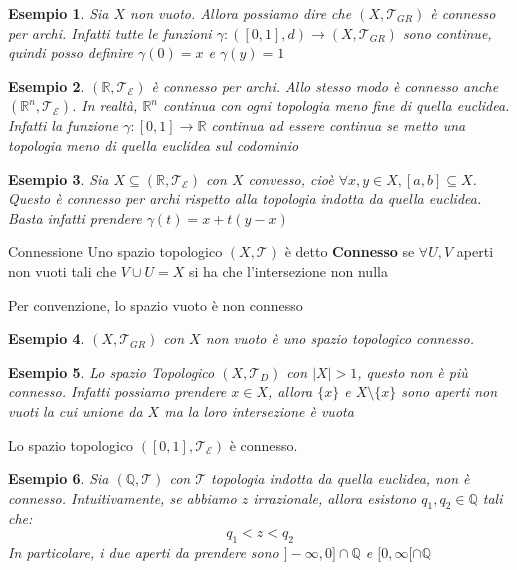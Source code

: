 \documentclass[11pt,a4paper,twoside]{article}
\newtheorem{es}{Esempio}
\theoremstyle{definition}
\begin{document}
\begin{es}
	Sia $X$ non vuoto. Allora possiamo dire che $(X, \mathcal T_{GR})$ è connesso per archi. Infatti tutte le funzioni $\gamma:([0,1],d) \to (X, \mathcal T_{GR})$ sono continue, quindi posso definire $\gamma(0)=x$ e $\gamma(y)=1$
\end{es}

\begin{es}
	$(\mathbb R, \mathcal T_\mathcal E)$ è connesso per archi. Allo stesso modo è connesso anche $(\mathbb R^n, \mathcal T_\mathcal E)$. In realtà, $\mathbb R^n$ continua con ogni topologia meno fine di quella euclidea. Infatti la funzione $\gamma:[0,1]\to \mathbb R$ continua ad essere continua se metto una topologia meno di quella euclidea sul codominio
\end{es}

\begin{es}
	Sia $X \subseteq (\mathbb R, \mathcal T_\mathcal E)$ con $X$ convesso, cioè $\forall x,y \in X, [a,b] \subseteq X$. Questo è connesso per archi rispetto alla topologia indotta da quella euclidea. Basta infatti prendere $\gamma(t) = x+t(y-x)$
\end{es}

\begin{defn}{Connessione}{}
	Uno spazio topologico $(X, \mathcal T)$ è detto \textbf{Connesso} se $\forall U,V$ aperti non vuoti tali che $V \cup U = X$ si ha che l'intersezione non nulla
\end{defn}

Per convenzione, lo spazio vuoto è non connesso

\begin{es}
	$(X, \mathcal T_{GR})$ con $X$ non vuoto è uno spazio topologico connesso.
\end{es}

\begin{es}
	Lo spazio Topologico $(X, \mathcal T_{D})$ con $|X|>1$, questo non è più connesso. Infatti possiamo prendere $x \in X$, allora $\{x\}$ e $X\setminus \{x\}$ sono aperti non vuoti la cui unione da $X$ ma la loro intersezione è vuota
\end{es}

\begin{thm}{}{}
	Lo spazio topologico $([0,1], \mathcal T_\mathcal E)$ è connesso.
\end{thm}

\begin{es}
	Sia $(\mathbb Q, \mathcal T)$ con $\mathcal T$ topologia indotta da quella euclidea, non è connesso. Intuitivamente, se abbiamo $z$ irrazionale, allora esistono $q_1, q_2 \in \mathbb Q$ tali che:
	\[q_1 <z<q_2\]
	In particolare, i due aperti da prendere sono $] -\infty, 0]\cap \mathbb Q$ e $[0, \infty[\cap \mathbb Q$
\end{es}
\end{document}
